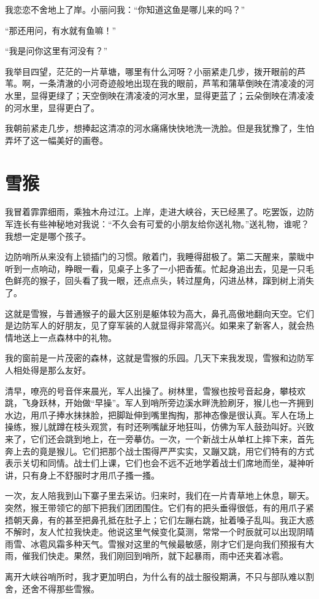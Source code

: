 \documentclass[12pt,UTF-8,openany]{ctexbook}
\begin{document}
\begin{large}
    我恋恋不舍地上了岸。小丽问我：“你知道这鱼是哪儿来的吗？”
    
    “那还用问，有水就有鱼嘛！”
    
    “我是问你这里有河没有？”
    
    我举目四望，茫茫的一片草塘，哪里有什么河呀？小丽紧走几步，拨开眼前的芦苇。啊，一条清澈的小河奇迹般地出现在我的眼前，芦苇和蒲草倒映在清凌凌的河水里，显得更绿了；天空倒映在清凌凌的河水里，显得更蓝了；云朵倒映在清凌凌的河水里，显得更白了。
    
    我朝前紧走几步，想捧起这清凉的河水痛痛快快地洗一洗脸。但是我犹豫了，生怕弄坏了这一幅美好的画卷。
    
\end{large}



\chapter{雪猴}

\begin{large}
    
    我冒着霏霏细雨，乘独木舟过江。上岸，走进大峡谷，天已经黑了。吃罢饭，边防军连长有些神秘地对我说：“不久会有可爱的小朋友给你送礼物。”送礼物，谁呢？我想一定是哪个孩子。
    
    边防哨所从来没有上锁插门的习惯。敞着门，我睡得甜极了。第二天醒来，蒙眬中听到一点响动，睁眼一看，见桌子上多了一小把香蕉。忙起身追出去，见是一只毛色鲜亮的猴子，回头看了我一眼，还点点头，转过屋角，闪进丛林，蹿到树上消失了。
    
    这就是雪猴，与普通猴子的最大区别是躯体较为高大，鼻孔高傲地翻向天空。它们是边防军人的好朋友，见了穿军装的人就显得非常高兴。如果来了新客人，就会热情地送上一点森林中的礼物。
    
    我的窗前是一片茂密的森林，这就是雪猴的乐园。几天下来我发现，雪猴和边防军人相处得是那么友好。
    
    清早，嘹亮的号音伴来晨光，军人出操了。树林里，雪猴也按号音起身，攀枝欢跳，飞身跃林，开始做“早操”。军人到哨所旁边溪水畔洗脸刷牙，猴儿也一齐拥到水边，用爪子捧水抹抹脸，把脚趾伸到嘴里掏掏，那神态像是很认真。军人在场上操练，猴儿就蹲在枝头观赏，有时还咧嘴龇牙地狂叫，仿佛为军人鼓劲叫好。兴致来了，它们还会跳到地上，在一旁摹仿。一次，一个新战士从单杠上摔下来，首先奔上去的竟是猴儿。它们把那个战士围得严严实实，又蹦又跳，用它们特有的方式表示关切和同情。战士们上课，它们也会不远不近地学着战士们席地而坐，凝神听讲，只有身上不舒服时才用爪子搔一搔。
    
    一次，友人陪我到山下寨子里去采访。归来时，我们在一片青草地上休息，聊天。突然，猴王带领它的部下把我们团团围住。它们有的把头垂得很低，有的用爪子紧捂朝天鼻，有的甚至把鼻孔抵在肚子上；它们左蹦右跳，扯着嗓子乱叫。我正大惑不解时，友人忙拉我快走。他说这里气候变化莫测，常常一个时辰就可以出现阴晴雨雪、冰雹风霜多种天气。雪猴对这里的气候最敏感，刚才它们是向我们预报有大雨，催我们快走。果然，我们刚回到哨所，就下起暴雨，雨中还夹着冰雹。
    
    离开大峡谷哨所时，我才更加明白，为什么有的战士服役期满，不只与部队难以割舍，还舍不得那些雪猴。
    
\end{large}
\end{document}
